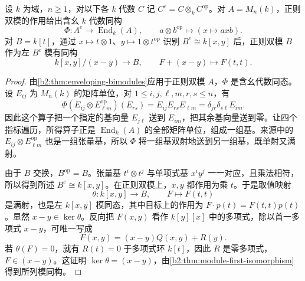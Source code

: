 \begin{proposition}\label{b2:prop:regular-enveloping-models}
	设 \(k\) 为域，\(n\ge1\)，对以下各 \(k\) 代数 \(C\) 记 \(C^e=C\otimes_k C^{\mathrm{op}}\)。对 \(A=M_n(k)\)，正则双模的作用给出含幺 \(k\) 代数同构
	\[
		\Phi:A^e\longrightarrow\operatorname{End}_k(A), \qquad a\otimes b^{\mathrm{op}}\longmapsto(x\mapsto axb).
	\]
	对 \(B=k[t]\)，通过 \(x\mapsto t\otimes1\)、\(y\mapsto1\otimes t^{\mathrm{op}}\) 识别 \(B^e\cong k[x,y]\) 后，正则双模 \(B\) 作为左 \(B^e\) 模有同构
	\[
		k[x,y]/(x-y)\longrightarrow B, \qquad F+(x-y)\longmapsto F(t,t).
	\]
\end{proposition}
\begin{proof}
	由\cref{b2:thm:enveloping-bimodules}应用于正则双模 \(A\)，\(\Phi\) 是含幺代数同态。设 \(E_{ij}\) 为 \(M_n(k)\) 的矩阵单位，对 \(1\le i,j,\ell,m,r,s\le n\)，有
	\[
		\Phi(E_{ij}\otimes E_{\ell m}^{\mathrm{op}})(E_{rs}) =E_{ij}E_{rs}E_{\ell m} =\delta_{jr}\delta_{s\ell}E_{im}.
	\]
	因此这个算子把一个指定的基向量 \(E_{j\ell}\) 送到 \(E_{im}\)，把其余基向量送到零。让四个指标遍历，所得算子正是 \(\operatorname{End}_k(A)\) 的全部矩阵单位，组成一组基。来源中的 \(E_{ij}\otimes E_{\ell m}^{\mathrm{op}}\) 也是一组张量基，所以 \(\Phi\) 将一组基双射地送到另一组基，既单射又满射。

	由于 \(B\) 交换，\(B^{\mathrm{op}}=B\)。张量基 \(t^i\otimes t^j\) 与单项式基 \(x^iy^j\) 一一对应，且乘法相符，所以得到所述 \(B^e\cong k[x,y]\)。在正则双模上，\(x,y\) 都作用为乘 \(t\)。于是取值映射
	\[
		\theta:k[x,y]\longrightarrow B,\qquad F\longmapsto F(t,t)
	\]
	是满射，也是左 \(k[x,y]\) 模同态，其中目标上的作用为 \(F\cdot p(t)=F(t,t)p(t)\)。显然 \(x-y\in\ker\theta\)。反向把 \(F(x,y)\) 看作 \(k[y][x]\) 中的多项式，除以首一多项式 \(x-y\)，可唯一写成
	\[
		F(x,y)=(x-y)Q(x,y)+R(y).
	\]
	若 \(\theta(F)=0\)，就有 \(R(t)=0\) 于多项式环 \(k[t]\)，因此 \(R\) 是零多项式，\(F\in(x-y)\)。这证明 \(\ker\theta=(x-y)\)，由\cref{b2:thm:module-first-isomorphism}得到所列模同构。
\end{proof}
